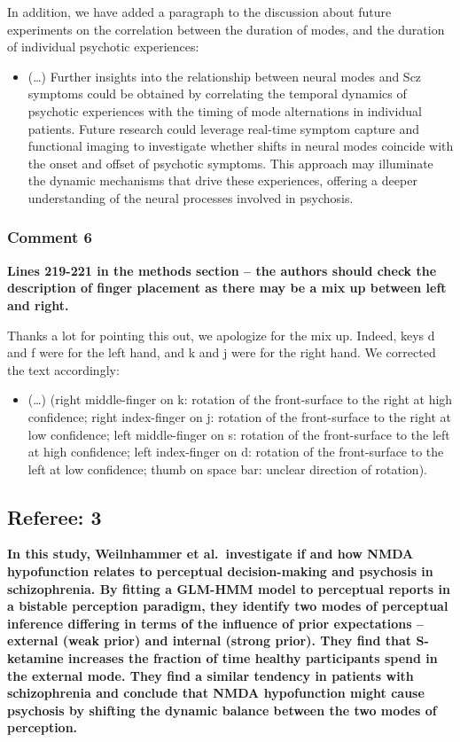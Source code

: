 \documentclass[
]{article}
\providecommand{\tightlist}{%
  \setlength{\itemsep}{0pt}\setlength{\parskip}{0pt}}
\begin{document}
In addition, we have added a paragraph to the discussion about future
experiments on the correlation between the duration of modes, and the
duration of individual psychotic experiences:

\begin{itemize}
\tightlist
\item
  (\ldots) Further insights into the relationship between neural modes
  and Scz symptoms could be obtained by correlating the temporal
  dynamics of psychotic experiences with the timing of mode alternations
  in individual patients. Future research could leverage real-time
  symptom capture and functional imaging to investigate whether shifts
  in neural modes coincide with the onset and offset of psychotic
  symptoms. This approach may illuminate the dynamic mechanisms that
  drive these experiences, offering a deeper understanding of the neural
  processes involved in psychosis.
\end{itemize}

\subsubsection{Comment 6}\label{comment-6-1}

\textbf{Lines 219-221 in the methods section -- the authors should check
the description of finger placement as there may be a mix up between
left and right.}

Thanks a lot for pointing this out, we apologize for the mix up. Indeed,
keys d and f were for the left hand, and k and j were for the right
hand. We corrected the text accordingly:

\begin{itemize}
\tightlist
\item
  (\ldots) (right middle-finger on k: rotation of the front-surface to
  the right at high confidence; right index-finger on j: rotation of the
  front-surface to the right at low confidence; left middle-finger on s:
  rotation of the front-surface to the left at high confidence; left
  index-finger on d: rotation of the front-surface to the left at low
  confidence; thumb on space bar: unclear direction of rotation).
\end{itemize}

\subsection{Referee: 3}\label{referee-3}

\textbf{In this study, Weilnhammer et al.~investigate if and how NMDA
hypofunction relates to perceptual decision-making and psychosis in
schizophrenia. By fitting a GLM-HMM model to perceptual reports in a
bistable perception paradigm, they identify two modes of perceptual
inference differing in terms of the influence of prior expectations --
external (weak prior) and internal (strong prior). They find that
S-ketamine increases the fraction of time healthy participants spend in
the external mode. They find a similar tendency in patients with
schizophrenia and conclude that NMDA hypofunction might cause psychosis
by shifting the dynamic balance between the two modes of perception.}
\end{document}
